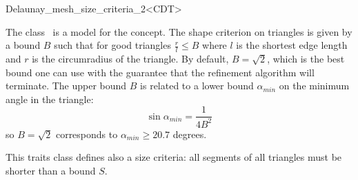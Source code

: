 \begin{ccRefClass}{Delaunay_mesh_size_criteria_2<CDT>}

\ccDefinition
  
The class \ccRefName\ is a model for the  concept.
The shape criterion on triangles is given by a bound $B$ such that for good
triangles $\frac{r}{l} \le B$ where $l$ is the shortest edge length
and $r$ is the circumradius of the triangle.  By default, $B=\sqrt{2}$,
which is the best bound one can use with the guarantee that the refinement
algorithm will terminate. The upper bound $B$ is related to a lower bound
$\alpha_{min}$ on the minimum angle in the triangle:
\begin{displaymath}
  \sin{ \alpha_{min} } = \frac{1}{4 B^2}
\end{displaymath}
so $B=\sqrt{2}$ corresponds to  $\alpha_{min} \ge 20.7$ degrees.

This traits class defines also a size criteria: all segments of all
triangles must be shorter than a bound $S$.


\ccIsModel


\ccCreation
{}

\end{ccRefClass}

